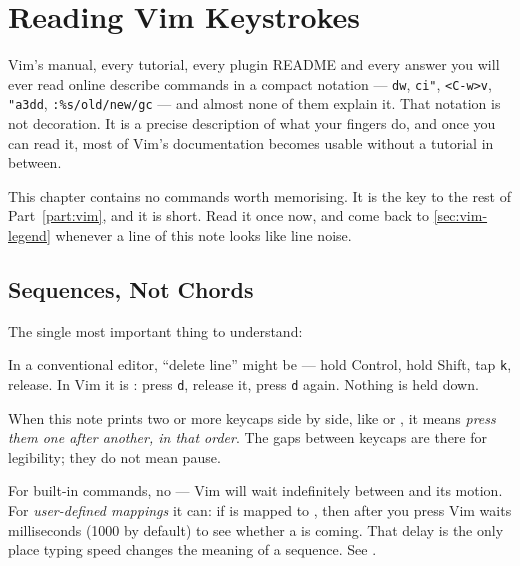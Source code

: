 \chapter{Reading Vim Keystrokes}\label{ch:vim-notation}

Vim's manual, every tutorial, every plugin README and every answer you will
ever read online describe commands in a compact notation --- \texttt{dw},
\texttt{ci"}, \texttt{<C-w>v}, \texttt{"a3dd}, \texttt{:\%s/old/new/gc} --- and
almost none of them explain it. That notation is not decoration. It is a
precise description of what your fingers do, and once you can read it, most of
Vim's documentation becomes usable without a tutorial in between.

This chapter contains no commands worth memorising. It is the key to the
rest of Part~\ref{part:vim}, and it is short. Read it once now, and come back to
\autoref{sec:vim-legend} whenever a line of this note looks like line noise.

\section{Sequences, Not Chords}\label{sec:vim-sequences}

The single most important thing to understand: 

In a conventional editor, ``delete line'' might be  --- hold
Control, hold Shift, tap \texttt{k}, release. In Vim it is  :
press \texttt{d}, release it, press \texttt{d} again. Nothing is held down.

\begin{notation}
	When this note prints two or more keycaps side by side, like  
	or    , it means \emph{press them one after
		another, in that order}. The gaps between keycaps are there for legibility;
	they do not mean pause.
\end{notation}

\begin{remark}
	For built-in commands, no --- Vim will wait indefinitely between  and
	its motion. For \emph{user-defined mappings} it can: if   is
	mapped to , then after you press  Vim waits
	 milliseconds (1000 by default) to see whether a  is
	coming. That delay is the only place typing speed changes the meaning of a
	sequence. See .
\end{remark}


